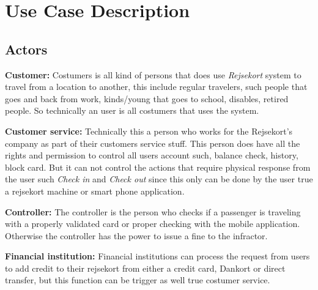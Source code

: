 \renewcommand{\headrulewidth}{0.1pt}
\renewcommand{\footrulewidth}{0.1pt}

\section*{Use Case Description}

\subsection*{Actors}

\textbf{Customer:}
Costumers is all kind of persons that does use \textit{Rejsekort} system to travel from a location to another, this include regular travelers, such people that goes and back from work, kinds/young that goes to school, disables, retired people. So technically an user is all costumers that uses the system.


\textbf{Customer service:}
Technically this a person who works for the Rejsekort's company as part of their customers service stuff. This person does have all the rights and permission to control all users account such, balance check, history, block card. But it can not control the actions that require physical response from the user such \textit{Check in} and \textit{Check out} since this only can be done by the user true a rejsekort machine or smart phone application. 


\textbf{Controller:}
The controller is the person who checks if a passenger is traveling with a properly validated card or proper checking with the mobile application. Otherwise the controller has the power to issue a fine to the infractor.


\textbf{Financial institution:}
Financial institutions can process the request from users to add credit to their rejsekort from either a credit card, Dankort or direct transfer, but this function can be trigger as well true costumer service.


